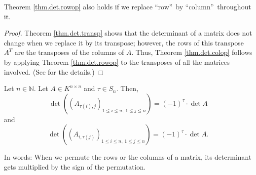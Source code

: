 \begin{theorem}
\label{thm.det.colop}Theorem \ref{thm.det.rowop}
also holds if we replace \textquotedblleft row\textquotedblright\ by
\textquotedblleft column\textquotedblright\ throughout it.
\end{theorem}

\begin{proof}
Theorem \ref{thm.det.transp} shows that the determinant of a matrix does not
change when we replace it by its transpose; however, the rows of this
transpose $A^{T}$ are the transposes of the columns of $A$. Thus, Theorem
\ref{thm.det.colop} follows by applying Theorem \ref{thm.det.rowop} to the
transposes of all the matrices involved. (See \cite[Exercises 6.7 and
6.8]{detnotes} for the details.)
\end{proof}

\begin{corollary}
\label{cor.det.sig-row-col}Let $n\in\mathbb{N}$. Let $A\in K^{n\times n}$ and
$\tau\in S_{n}$. Then,%
\begin{equation}
\det\left(  \left(  A_{\tau\left(  i\right)  ,j}\right)  _{1\leq i\leq
n,\ 1\leq j\leq n}\right)  =\left(  -1\right)  ^{\tau}\cdot\det A
\label{eq.cor.det.sig-row-col.row}%
\end{equation}
and%
\begin{equation}
\det\left(  \left(  A_{i,\tau\left(  j\right)  }\right)  _{1\leq i\leq
n,\ 1\leq j\leq n}\right)  =\left(  -1\right)  ^{\tau}\cdot\det A.
\label{eq.cor.det.sig-row-col.col}%
\end{equation}

\end{corollary}

In words: When we permute the rows or the columns of a matrix, its determinant
gets multiplied by the sign of the permutation.

